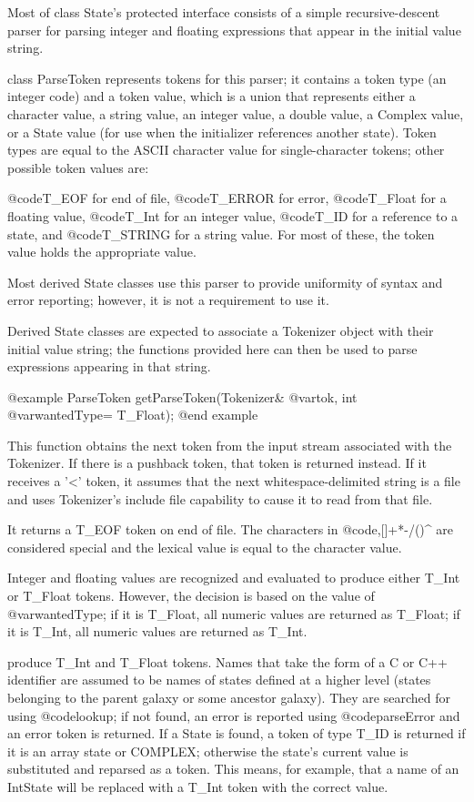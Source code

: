 Most of class State's protected interface consists of a simple
recursive-descent parser for parsing integer and floating expressions
that appear in the initial value string.

class ParseToken represents tokens for this parser; it contains a
token type (an integer code) and a token value, which is a
union that represents either a character value, a string value, an
integer value, a double value, a Complex value, or a State value
(for use when the initializer references another state).  Token
types are equal to the ASCII character value for single-character
tokens; other possible token values are:

@code{T_EOF} for end of file, @code{T_ERROR} for error, @code{T_Float}
for a floating value, @code{T_Int} for an integer value, @code{T_ID}
for a reference to a state, and @code{T_STRING} for a string value.
For most of these, the token value holds the appropriate value.

Most derived State classes use this parser to provide uniformity
of syntax and error reporting; however, it is not a requirement to
use it.

Derived State classes are expected to associate a Tokenizer object
with their initial value string; the functions provided here can
then be used to parse expressions appearing in that string.

@example
ParseToken getParseToken(Tokenizer& @var{tok}, int @var{wantedType}= T_Float);
@end example

This function obtains the next token from the input stream associated
with the Tokenizer.  If there is a pushback token, that token is
returned instead.  If it receives a '<' token, it assumes that the
next whitespace-delimited string is a file and uses Tokenizer's include
file capability to cause it to read from that file.

It returns a T_EOF token on end of file.  The characters in @code{,[]+*-/()^}
are considered special and the lexical value is equal to the character
value.

Integer and floating values are recognized and evaluated to produce
either T_Int or T_Float tokens.  However, the decision is based on
the value of @var{wantedType}; if it is T_Float, all numeric values
are returned as T_Float; if it is T_Int, all numeric values are returned
as T_Int.

produce T_Int and T_Float tokens.  Names that take the form of a
C or C++ identifier are assumed to be names of states defined at a
higher level (states belonging to the parent galaxy or some ancestor
galaxy).  They are searched for using @code{lookup}; if not found,
an error is reported using @code{parseError} and an error token is
returned.  If a State is found, a token of type T_ID is returned if
it is an array state or COMPLEX; otherwise the state's current value
is substituted and reparsed as a token.  This means, for example, that
a name of an IntState will be replaced with a T_Int token with the
correct value.

